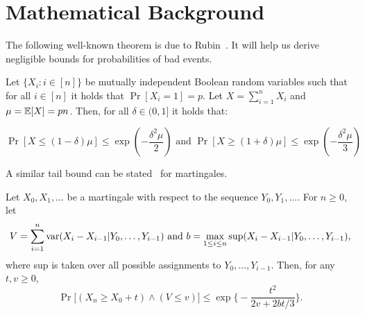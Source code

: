 \section{Mathematical Background}

The following well-known theorem is due to
Rubin~\cite{chernoff1952measure,chernoff2014career}. It will help us derive
negligible bounds for probabilities of bad events.

\begin{theorem}
  Let $\{X_i: i \in [n]\}$ be mutually independent Boolean random variables
  such that for all $i \in [n]$ it holds that $\Pr[X_i = 1] = p$. Let
  $X = \sum_{i = 1}^n X_i$ and $\mu = \operatorname{\mathbb{E}}[X] = pn$. Then, for all
  $\delta \in (0, 1]$ it holds that:

  \[
    \Pr[X \leq (1 - \delta)\mu] \leq \exp(-\frac{\delta^2\mu}{2})
    \text{ and }
    \Pr[X \geq (1 + \delta)\mu] \leq \exp(-\frac{\delta^2\mu}{3})
  \]
\end{theorem}

A similar tail bound can be stated~\cite[Theorem~3.15]{mcdiarmid1998} for martingales.

\begin{theorem}
\label{theorem:tailbound}
	Let $X_0,X_1,\dots$ be a martingale with respect to the sequence
	$Y_0,Y_1,\dots$.
	For $n\ge0$, let
	\[
		V=\sum_{i=1}^n\mathrm{var}(X_i-X_{i-1}|Y_0,\dots,Y_{i-1})
		\hbox{~and~}
		b=\max_{1\leq i\leq n}\sup(X_i-X_{i-1}|Y_0,\dots,Y_{i-1})
	,\]
	where sup is taken over all possible assignments to $Y_0,\dots,Y_{i-1}$.
	Then, for any $t,v\ge0$,
	\[\Pr\bigl[(X_n\ge X_0+t)\wedge(V\leq v)\bigr]\le\exp\biggl\{-\frac{t^2}{2v+2bt/3}\biggr\}.\]
\end{theorem}

